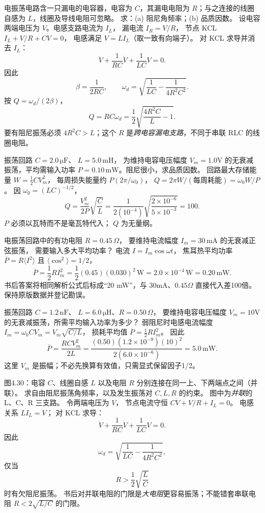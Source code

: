 电振荡电路含一只漏电的电容器，电容为 $C$，其漏电电阻为 $R$；与之连接的线圈自感为 $L$，线圈及导线电阻可忽略。
求：(a) 阻尼角频率；(b) 品质因数。
\exsolution
设电容两端电压为 $V$。电感支路电流为 $I_L$，
漏电流 $I_R=V/R$，
节点 KCL
$I_L+V/R+C\dot V=0$，
电感满足 $V=L\dot I_L$（取一致有向端子）。
对 KCL 求导并消去 $I_L$：
\[
\ddot V+\frac1{RC}\dot V+\frac1{LC}V=0.
\]
因此
\[
\boxed{\beta=\frac1{2RC}},\qquad
\boxed{\omega_d=\sqrt{\frac1{LC}-\frac1{4R^2C^2}}}.
\]
按 $Q=\omega_d/(2\beta)$，
\[
\boxed{Q=RC\omega_d
=\frac12\sqrt{\frac{4R^2C}{L}-1}}.
\]
\excheck 要有阻尼振荡必须 $4R^2C>L$；这个 $R$ 是\emph{跨电容漏电支路}，不同于串联 RLC 的线圈电阻。

振荡回路 $C=2.0\,\mathrm{\mu F}$、
$L=5.0\,\mathrm{mH}$，
为维持电容电压幅度 $V_m=1.0$V 的无衰减振荡，平均需输入功率
$P=0.10\,\mathrm{mW}$。阻尼很小，求品质因数。
\exsolution
回路最大存储能量
$W=\tfrac12CV_m^2$，
每周损失能量约 $P(2\pi/\omega_0)$，
$Q=2\pi W/(\text{每周耗能})=\omega_0W/P$。
因 $\omega_0=(LC)^{-1/2}$，
\[
\boxed{Q=\frac{V_m^2}{2P}\sqrt{\frac CL}}
=\frac{1}{2(10^{-4})}\sqrt{\frac{2\times10^{-6}}{5\times10^{-3}}}
=\boxed{100}.
\]
\excheck $P$ 必须以瓦特而不是毫瓦特代入；
$Q$ 为无量纲。

电振荡回路中的有功电阻 $R=0.45\,\Omega$，
要维持电流幅度
$I_m=30\,\mathrm{mA}$ 的无衰减正弦振荡，
需要输入多大平均功率？
\exsolution
电流 $I=I_m\cos\omega t$，
焦耳热平均功率
$\overline P=R\langle I^2\rangle$
且 $\langle\cos^2\rangle=1/2$，
\[
\boxed{\overline P=\frac12RI_m^2}
=\frac12(0.45)(0.030)^2\,\mathrm W
=\boxed{2.0\times10^{-4}\,\mathrm W
=0.20\,\mathrm{mW}}.
\]
\excheck 书后答案将相同解析公式后标成“20 mW”，与 $30$mA、$0.45\Omega$ 直接代入差100倍。保持原版数据并登记勘误。

振荡回路 $C=1.2\,\mathrm{nF}$、
$L=6.0\,\mathrm{\mu H}$、$R=0.50\,\Omega$，
要维持电容电压幅度
$V_m=10$V 的无衰减振荡，所需平均输入功率为多少？
\exsolution
弱阻尼时电感电流幅度
$I_m=\omega_0CV_m=
V_m\sqrt{C/L}$，
损耗平均值
$\overline P=\tfrac12 R I_m^2$。
因此
\[
\boxed{\overline P=\frac{RCV_m^2}{2L}}
=\frac{(0.50)(1.2\times10^{-9})(10)^2}
{2(6.0\times10^{-6})}
=\boxed{5.0\,\mathrm{mW}}.
\]
\excheck 这里 $V_m$ 是振幅；不必先换算有效值，只需显式保留因子1/2。

图4.30：电容 $C$、线圈自感 $L$ 以及电阻 $R$ 分别连接在同一上、下两端点之间（并联）。
求自由阻尼振荡角频率，以及发生振荡对 $C,L,R$ 的约束。
\exsolution
图中为\emph{并联}的 L、C、R 三支路。
令两端电压为 $V$，
节点电流守恒
$C\dot V+V/R+I_L=0$。
电感关系 $L\dot I_L=V$；
对 KCL 求导：
\[
\ddot V+\frac1{RC}\dot V+\frac1{LC}V=0.
\]
因此
\[
\boxed{\omega_d=
\sqrt{\frac1{LC}-\frac1{4R^2C^2}}},
\]
仅当
\[
\boxed{R>\frac12\sqrt{\frac LC}}
\]
时有欠阻尼振荡。
\excheck 书后对并联电阻的门限是\emph{大电阻}更容易振荡；不能错套串联电阻 $R<2\sqrt{L/C}$ 的门限。

